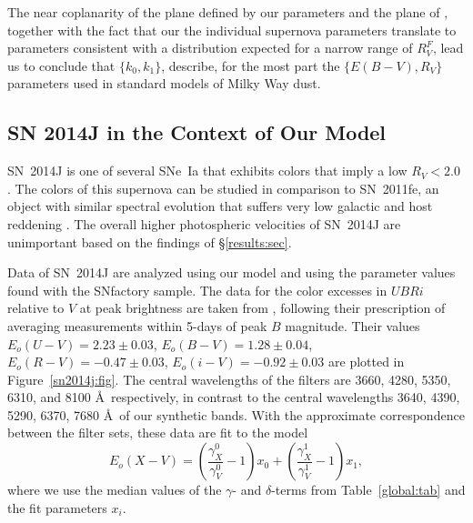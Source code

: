 \documentclass{aastex61}   	%
\begin{document}
The near coplanarity of the plane defined by our parameters and the plane of  , together with the fact that our the individual supernova
parameters translate to   parameters consistent with a distribution expected for a narrow range of $R^F_V$, lead us to conclude that 
$\{k_0, k_1\}$, describe, for the most part the $\{ E(B-V), R_V\}$ parameters used
in standard models of Milky Way dust.

\subsection{SN 2014J in the Context of Our Model}
\label{sn2014j:sec}

SN~2014J   is one of several SNe~Ia that exhibits colors that imply a low $R_V<2.0$ \citep{2014ApJ...788L..21A, 2014MNRAS.443.2887F, 
2014arXiv1411.3332J,
2014ApJ...795L...4K, 2015ApJ...805...74B}.
The colors of this supernova can be studied in comparison to SN~2011fe, an object with similar
spectral evolution that 
suffers very low galactic and host reddening
\citep[this technique has been used in][]{2006MNRAS.369.1880E,2007AJ....133...58K,2008MNRAS.384..107E,2010AJ....139..120F, 2014ApJ...788L..21A}.
The overall higher photospheric velocities of
SN~2014J are unimportant  based on the findings of  \S\ref{results:sec}.

Data of SN~2014J are  analyzed using our model and using the parameter values found with the SNfactory sample.
The data for the color excesses  in $UBRi$  relative to $V$ at peak brightness  are taken from \citet{2014ApJ...788L..21A},
following their prescription of averaging measurements within 5-days of peak $B$ magnitude.
Their values 
$E_o(U-V) =   2.23 \pm   0.03$,
$E_o(B-V) =   1.28 \pm   0.04$,
$E_o(R-V) =  -0.47 \pm   0.03$,
$E_o(i-V) =  -0.92 \pm   0.03$
are plotted in Figure~\ref{sn2014j:fig}.
\color{red}
The central wavelengths of the filters are 3660, 4280, 5350, 6310, and 8100 \AA\ respectively, in contrast to the central
wavelengths 
3640, 4390, 5290, 6370, 7680 \AA\ of our synthetic bands.  With the approximate correspondence between the filter sets,
\color{black}
these data are fit to the model
\begin{equation}
E_o(X-V) =  \left(\frac{\gamma^0_X}{\gamma^0_V}-1\right)x_0 +  \left(\frac{\gamma^1_X}{\gamma^1_V}-1\right)x_1,
\end{equation}
where we use the median values of the $\gamma$- and $\delta$-terms from Table~\ref{global:tab} and the fit
parameters $x_i $.
\end{document}
